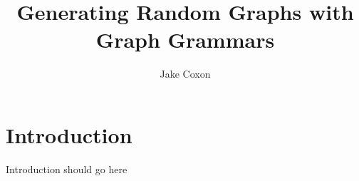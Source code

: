 \documentclass{article}
\begin{document}
\title{Generating Random Graphs with Graph Grammars}
\author{Jake Coxon}
\maketitle

\tableofcontents

\section{Introduction}
Introduction should go here


    
{}

\end{document}
